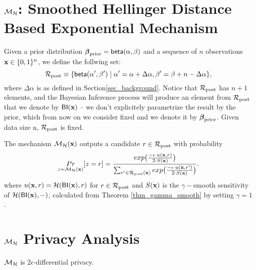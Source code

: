 \documentclass{article}
\begin{document}
\section{$\mathcal{M}_{\mathcal{H}}$: Smoothed Hellinger Distance Based Exponential Mechanism}
\label{sec_mechs}
Given a prior distribution $\boldsymbol{\beta}_{\textup{prior}} = \mathsf{beta}(\alpha, \beta)$ and a sequence of $n$ observations $\textbf{x}\in\{0,1\}^n$, we define the follwing set:
\[
  \mathcal{R}_{\textup{post}} \equiv\{\mathsf{beta}(\alpha',\beta')\mid \alpha'=\alpha+\Delta\alpha, \beta'=\beta+n-\Delta\alpha\},
\]
where $\Delta\alpha$ is as defined in Section\ref{sec_background}.
Notice that $\mathcal{R}_{\textup{post}}$ has $n + 1$ elements, and
the Bayesian Inference process will produce an element from $\mathcal{R}_{\textup{post}}$
that we denote by $\mathsf{BI}(\textbf{x})$ -- we don't explicitely
parametrize the result by the prior, which from now on we consider
fixed and we denote it by $\boldsymbol{\beta}_{\textup{prior}}$. Given data size n, $\mathcal{R}_{\textup{post}}$ is fixed.

\begin{definition}
\label{def_smoo}
The mechanism $\mathcal{M}_{\mathcal{H}}(\textbf{x})$ outputs a candidate $r \in \mathcal{R}_{\textup{post}}$ with probability
\begin{equation*}
  \underset{z \thicksim \mathcal{M}_{\mathcal{H}}(\textbf{x})}{Pr}[z = r] = \frac {exp\big(\frac{-\epsilon\cdot u(\textbf{x}, {r})}{2\cdot S(\textbf{x})}\big)}
{\sum_{r'\in \mathcal{R}_{\textup{post}}(\textbf{x})} exp \big(\frac{-\epsilon\cdot u(\textbf{\textbf{x}}, r')}{2 \cdot S(\textbf{x})}\big)}.
\end{equation*}
where $u(\textbf{x}, {r}) = \mathcal{H}(\mathsf{BI}(\textbf{x}),r)$ for $r \in \mathcal{R}_{\textup{post}}$ and $S(\textbf{x})$ is the $\gamma -$smooth sensitivity of $\mathcal{H}(\mathsf{BI}(\textbf{x}),-)$, calculated from Theorem \ref{thm_gamma_smooth} by setting $\gamma = 1$.
\end{definition}




\section{$\mathcal{M}_{\mathcal{H}}$ Privacy Analysis}

\begin{lem}
\label{lem_hexpmech_privacy}
$\mathcal{M}_{\mathcal{H}}$ is $2\epsilon$-differential privacy.
\end{lem}
\end{document}

